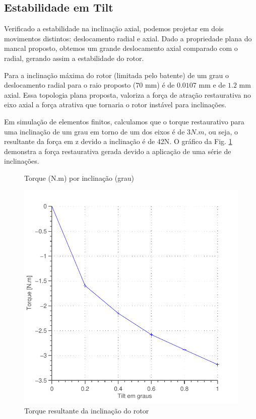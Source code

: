 \subsection{Estabilidade em Tilt}

Verificado a estabilidade na inclinação axial, podemos projetar  em dois movimentos distintos: deslocamento radial e axial. Dado a propriedade plana do mancal proposto, obtemos um grande deslocamento axial comparado com o radial, gerando assim a estabilidade do rotor.

Para a inclinação máxima do rotor (limitada pelo batente) de um grau o deslocamento radial para o raio proposto ($70$ mm) é de $0.0107$ mm e de $1.2$ mm axial. Essa topologia plana proposta, valoriza a força de atração restaurativa no eixo axial a força atrativa que tornaria o rotor instável para inclinações.

Em simulação de elementos finitos, calculamos que o torque restaurativo para uma inclinação de um grau em torno de um dos eixos é de $3 N.m$, ou seja, o resultante da força em z devido a inclinação é de 42N. O gráfico da Fig. \ref{fig:passivo:torque:tilt} demonstra a força restaurativa gerada devido a aplicação de uma série de inclinações.

\begin{figure}[!ht]
\centering
\caption*{Torque (N.m) por inclinação (grau) }
\includegraphics[width=0.7\linewidth]{Figs/Simulacoes/Passivo2/fem/passivo_otimizado_fem_tilt}
\caption{Torque resultante da inclinação do rotor}
\label{fig:passivo:torque:tilt} 
\end{figure}


